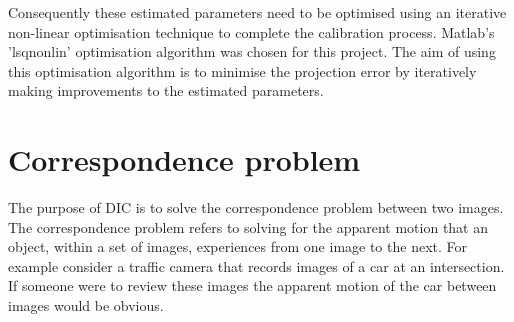 \documentclass[12pt,oneside,openany,a4paper, %
english, %
masters-t, goldenblock]{usthesis}
\begin{document}
Consequently these estimated parameters need to be optimised using an iterative non-linear optimisation technique to complete the calibration process. Matlab's 'lsqnonlin' optimisation algorithm was chosen for this project. The aim of using this optimisation algorithm is to minimise the projection error by iteratively making improvements to the estimated parameters.



\section{Correspondence problem}
\label{sec: correspondence problem}
The purpose of DIC is to solve the correspondence problem between two images. The correspondence problem refers to solving for the apparent motion that an object, within a set of images, experiences from one image to the next. For example consider a traffic camera that records images of a car at an intersection. If someone were to review these images the apparent motion of the car between images would be obvious. 
\end{document}
